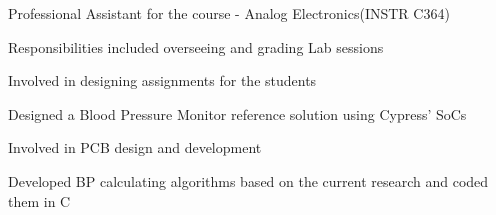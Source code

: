 \documentclass[letterpaper]{deedy-resume} %
\begin{document}
\begin{minipage}[t]{1.0\textwidth}
\sectionspace %


\begin{tightitemize}
\item Professional Assistant for the course - Analog Electronics(INSTR C364)
\item Responsibilities included overseeing and grading Lab sessions
\item Involved in designing assignments for the students
\end{tightitemize}

\sectionspace %


\begin{tightitemize}
\item Designed a Blood Pressure Monitor reference solution using Cypress' SoCs
\item Involved in PCB design and development
\item Developed BP calculating algorithms based on the current research and coded them in C
\end{tightitemize}

\end{minipage} %

\newpage %
\end{document}
